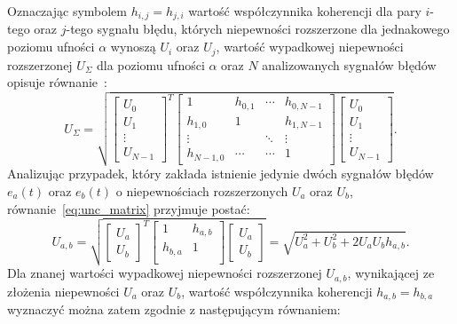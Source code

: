 Oznaczając symbolem $h_{i,j} = h_{j,i}$ wartość współczynnika koherencji dla pary $i$-tego oraz $j$-tego sygnału błędu, których niepewności rozszerzone dla jednakowego poziomu ufności $\alpha$ wynoszą $U_{i}$ oraz $U_{j}$, wartość wypadkowej niepewności rozszerzonej $U_{\Sigma}$ dla poziomu ufności $\alpha$ oraz $N$ analizowanych sygnałów błędów opisuje równanie~\cite{jakubiec_redmono}:
\begin{equation}
U_{\Sigma} = \sqrt{
\begin{bmatrix}
U_{0} \\ U_{1} \\ \vdots \\ U_{N-1}
\end{bmatrix}^{T}
\begin{bmatrix}
1         & h_{0,1} & \cdots & h_{0,N-1} \\
h_{1,0}   & 1       &        & h_{1,N-1} \\
\vdots    &         & \ddots & \vdots    \\
h_{N-1,0} & \cdots  & \cdots & 1
\end{bmatrix}
\begin{bmatrix}
U_{0} \\ U_{1} \\ \vdots \\ U_{N-1}
\end{bmatrix}}
\label{eq:unc_matrix}.
\end{equation}
Analizując przypadek, który zakłada istnienie jedynie dwóch sygnałów błędów $e_{a}(t)$ oraz $e_{b}(t)$ o niepewnościach rozszerzonych $U_{a}$ oraz $U_{b}$, równanie~\eqref{eq:unc_matrix} przyjmuje postać:
\begin{equation}
U_{a,b} = \sqrt{
\begin{bmatrix}
U_{a} \\ U_{b}
\end{bmatrix}^{T}
\begin{bmatrix}
1         & h_{a,b} \\
h_{b,a}   & 1       \\
\end{bmatrix}
\begin{bmatrix}
U_{a} \\ U_{b}
\end{bmatrix}} =
\sqrt{U_{a}^{2} + U_{b}^{2} + 2 U_{a} U_{b} h_{a,b}}
\label{eq:unc_mattwo}.
\end{equation}
Dla znanej wartości wypadkowej niepewności rozszerzonej $U_{a,b}$, wynikającej ze złożenia niepewności $U_{a}$ oraz $U_{b}$, wartość współczynnika koherencji $h_{a,b} = h_{b,a}$ wyznaczyć można zatem zgodnie z następującym równaniem:
